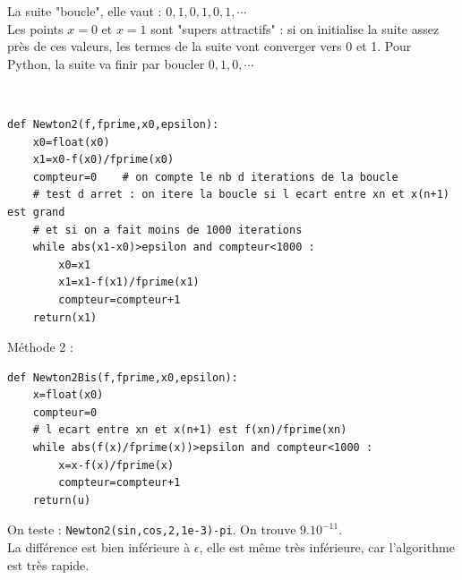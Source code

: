 \begin{solution}
La suite "boucle", elle vaut : $0,1,0,1,0,1,\cdots$\\
Les points $x=0$ et $x=1$ sont "supers attractifs" : si on initialise la suite assez pr\` es de ces valeurs, les termes de la suite vont converger vers 0 et 1. Pour Python, la suite va finir par boucler $0,1,0,\cdots$
\end{solution}


\begin{solution}~\\
\vspace*{-0.7cm}
\begin{verbatim}
def Newton2(f,fprime,x0,epsilon):
    x0=float(x0)
    x1=x0-f(x0)/fprime(x0)
    compteur=0    # on compte le nb d iterations de la boucle
    # test d arret : on itere la boucle si l ecart entre xn et x(n+1) est grand 
    # et si on a fait moins de 1000 iterations
    while abs(x1-x0)>epsilon and compteur<1000 : 
        x0=x1
        x1=x1-f(x1)/fprime(x1)
        compteur=compteur+1
    return(x1)  
\end{verbatim}    
Méthode 2 :    
\begin{verbatim}
def Newton2Bis(f,fprime,x0,epsilon):
    x=float(x0)
    compteur=0
    # l ecart entre xn et x(n+1) est f(xn)/fprime(xn)
    while abs(f(x)/fprime(x))>epsilon and compteur<1000 : 
        x=x-f(x)/fprime(x)
        compteur=compteur+1
    return(u)        
\end{verbatim}
\end{solution}

\begin{solution}
On teste : \verb?Newton2(sin,cos,2,1e-3)-pi?. On trouve $9.10^{-11}$.\\
La diff\' erence est bien inf\' erieure \` a $\epsilon$, elle est m\^ eme tr\` es inf\' erieure, car l'algorithme est tr\` es rapide.  
\end{solution}



